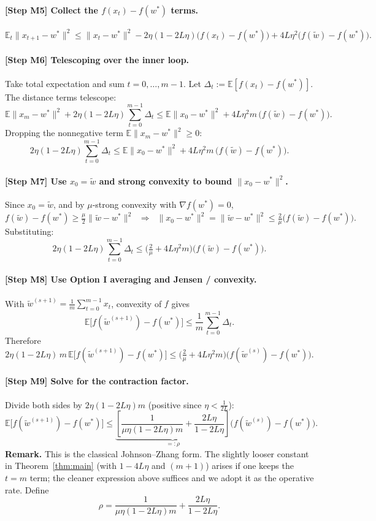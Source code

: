 \documentclass{article}
\begin{document}
\paragraph{[Step M5] Collect the $f(x_t)-f(w^*)$ terms.}
\[
\mathbb{E}_t\|x_{t+1}-w^*\|^2 \le \|x_t-w^*\|^2 - 2\eta(1-2L\eta)\big(f(x_t)-f(w^*)\big) + 4L\eta^2\big(f(\tilde{w})-f(w^*)\big).
\]

\paragraph{[Step M6] Telescoping over the inner loop.}
Take total expectation and sum $t=0,\dots,m-1$. Let $\Delta_t := \mathbb{E}[f(x_t)-f(w^*)]$. The distance terms telescope:
\[
\mathbb{E}\|x_m-w^*\|^2 + 2\eta(1-2L\eta)\sum_{t=0}^{m-1}\Delta_t
\le \mathbb{E}\|x_0 - w^*\|^2 + 4L\eta^2 m\,\big(f(\tilde{w})-f(w^*)\big).
\]
Dropping the nonnegative term $\mathbb{E}\|x_m-w^*\|^2 \ge 0$:
\[
2\eta(1-2L\eta)\sum_{t=0}^{m-1}\Delta_t
\le \mathbb{E}\|x_0 - w^*\|^2 + 4L\eta^2 m\,\big(f(\tilde{w})-f(w^*)\big).
\]

\paragraph{[Step M7] Use $x_0=\tilde{w}$ and strong convexity to bound $\|x_0-w^*\|^2$.}
Since $x_0 = \tilde{w}$, and by $\mu$-strong convexity with $\nabla f(w^*)=0$,
\[
f(\tilde{w}) - f(w^*) \ge \tfrac{\mu}{2}\|\tilde{w}-w^*\|^2 \;\;\Longrightarrow\;\; \|x_0-w^*\|^2 = \|\tilde{w}-w^*\|^2 \le \tfrac{2}{\mu}\big(f(\tilde{w})-f(w^*)\big).
\]
Substituting:
\[
2\eta(1-2L\eta)\sum_{t=0}^{m-1}\Delta_t
\le \Big(\tfrac{2}{\mu} + 4L\eta^2 m\Big)\big(f(\tilde{w})-f(w^*)\big).
\]

\paragraph{[Step M8] Use Option I averaging and Jensen / convexity.}
With $\tilde{w}^{(s+1)} = \frac{1}{m}\sum_{t=0}^{m-1}x_t$, convexity of $f$ gives
\[
\mathbb{E}\big[f(\tilde{w}^{(s+1)})-f(w^*)\big] \le \frac{1}{m}\sum_{t=0}^{m-1}\Delta_t.
\]
Therefore
\[
2\eta(1-2L\eta)\,m\,\mathbb{E}\big[f(\tilde{w}^{(s+1)})-f(w^*)\big]
\le \Big(\tfrac{2}{\mu} + 4L\eta^2 m\Big)\big(f(\tilde{w}^{(s)})-f(w^*)\big).
\]

\paragraph{[Step M9] Solve for the contraction factor.}
Divide both sides by $2\eta(1-2L\eta)m$ (positive since $\eta<\tfrac{1}{2L}$):
\[
\mathbb{E}\big[f(\tilde{w}^{(s+1)})-f(w^*)\big]
\le \underbrace{\left[\frac{1}{\mu\eta(1-2L\eta)m} + \frac{2L\eta}{1-2L\eta}\right]}_{=: \rho}\big(f(\tilde{w}^{(s)})-f(w^*)\big).
\]
\textbf{Remark.} This is the classical Johnson--Zhang form. The slightly looser constant in Theorem~\ref{thm:main} (with $1-4L\eta$ and $(m+1)$) arises if one keeps the $t=m$ term; the cleaner expression above suffices and we adopt it as the operative rate. Define
\[
\rho = \frac{1}{\mu\eta(1-2L\eta)m} + \frac{2L\eta}{1-2L\eta}.
\]
\end{document}
